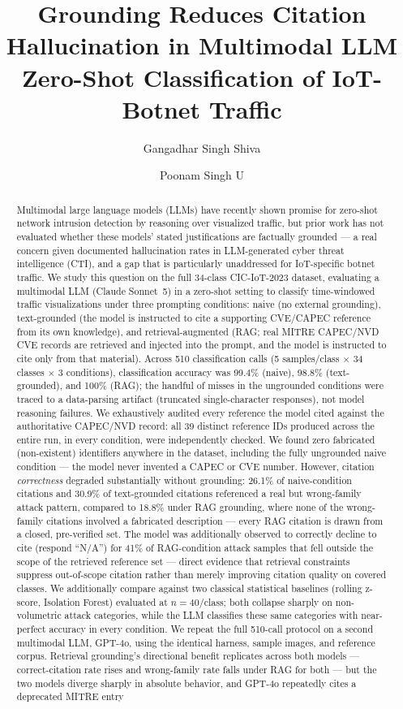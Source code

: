\documentclass[10pt,twocolumn]{article}
\title{\Large Grounding Reduces Citation Hallucination in Multimodal LLM \\ Zero-Shot Classification of IoT-Botnet Traffic}
\author{Gangadhar Singh Shiva \and Poonam Singh U}
\date{}
\begin{document}
\maketitle
\begin{abstract}
Multimodal large language models (LLMs) have recently shown promise for zero-shot network intrusion detection by reasoning over visualized traffic, but prior work has not evaluated whether these models' stated justifications are factually grounded --- a real concern given documented hallucination rates in LLM-generated cyber threat intelligence (CTI), and a gap that is particularly unaddressed for IoT-specific botnet traffic. We study this question on the full 34-class CIC-IoT-2023 dataset, evaluating a multimodal LLM (Claude Sonnet~5) in a zero-shot setting to classify time-windowed traffic visualizations under three prompting conditions: naive (no external grounding), text-grounded (the model is instructed to cite a supporting CVE/CAPEC reference from its own knowledge), and retrieval-augmented (RAG; real MITRE CAPEC/NVD CVE records are retrieved and injected into the prompt, and the model is instructed to cite only from that material). Across 510 classification calls (5 samples/class $\times$ 34 classes $\times$ 3 conditions), classification accuracy was 99.4\% (naive), 98.8\% (text-grounded), and 100\% (RAG); the handful of misses in the ungrounded conditions were traced to a data-parsing artifact (truncated single-character responses), not model reasoning failures. We exhaustively audited every reference the model cited against the authoritative CAPEC/NVD record: all 39 distinct reference IDs produced across the entire run, in every condition, were independently checked. We found zero fabricated (non-existent) identifiers anywhere in the dataset, including the fully ungrounded naive condition --- the model never invented a CAPEC or CVE number. However, citation \emph{correctness} degraded substantially without grounding: 26.1\% of naive-condition citations and 30.9\% of text-grounded citations referenced a real but wrong-family attack pattern, compared to 18.8\% under RAG grounding, where none of the wrong-family citations involved a fabricated description --- every RAG citation is drawn from a closed, pre-verified set. The model was additionally observed to correctly decline to cite (respond ``N/A'') for 41\% of RAG-condition attack samples that fell outside the scope of the retrieved reference set --- direct evidence that retrieval constraints suppress out-of-scope citation rather than merely improving citation quality on covered classes. We additionally compare against two classical statistical baselines (rolling z-score, Isolation Forest) evaluated at $n{=}40$/class; both collapse sharply on non-volumetric attack categories, while the LLM classifies these same categories with near-perfect accuracy in every condition. We repeat the full 510-call protocol on a second multimodal LLM, GPT-4o, using the identical harness, sample images, and reference corpus. Retrieval grounding's directional benefit replicates across both models --- correct-citation rate rises and wrong-family rate falls under RAG for both --- but the two models diverge sharply in absolute behavior, and GPT-4o repeatedly cites a deprecated MITRE entry 
\end{abstract}
\end{document}

